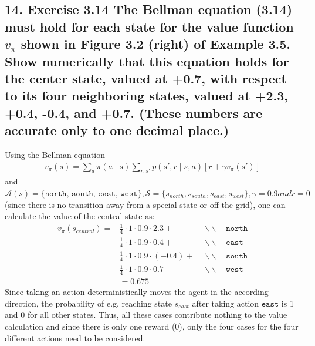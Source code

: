 \subsection*{14. Exercise 3.14 The Bellman equation (3.14) must hold for each state for the value function $v_\pi$ shown in Figure 3.2 (right) of Example 3.5. Show numerically that this equation holds for the center state, valued at +0.7, with respect to its four neighboring states, valued at +2.3, +0.4, -0.4, and +0.7. (These numbers are accurate only to one decimal place.)}
Using the Bellman equation
\begin{align*}
v_\pi (s) = \sum_a \pi (a \mid s) \sum_{r, s'} p(s', r \mid s, a)[r + \gamma v_\pi (s')]
\end{align*}
and $\mathcal{A}(s) = \{\texttt{north, south, east, west}\}, \mathcal{S} = \{s_{north}, s_{south}, s_{east}, s_{west}\}, \gamma = 0.9 and r = 0$ (since there is no transition away from a special state or off the grid), one can calculate the value of the central state as:
\begin{align*}
v_\pi(s_{central}) = &\frac{1}{4} \cdot 1 \cdot 0.9 \cdot 2.3 + \quad \quad \quad &\backslash \backslash \quad \texttt{north} \\
&\frac{1}{4} \cdot 1 \cdot 0.9 \cdot 0.4 + &\backslash \backslash \quad \texttt{east} \\
&\frac{1}{4} \cdot 1 \cdot 0.9 \cdot (-0.4) + &\backslash \backslash \quad \texttt{south} \\
&\frac{1}{4} \cdot 1 \cdot 0.9 \cdot 0.7 &\backslash \backslash \quad \texttt{west} \\
&= 0.675
\end{align*}
Since taking an action deterministically moves the agent in the according direction, the probability of e.g. reaching state $s_{east}$ after taking action $\texttt{east}$ is 1 and 0 for all other states. Thus, all these cases contribute nothing to the value calculation and since there is only one reward (0), only the four cases for the four different actions need to be considered.

